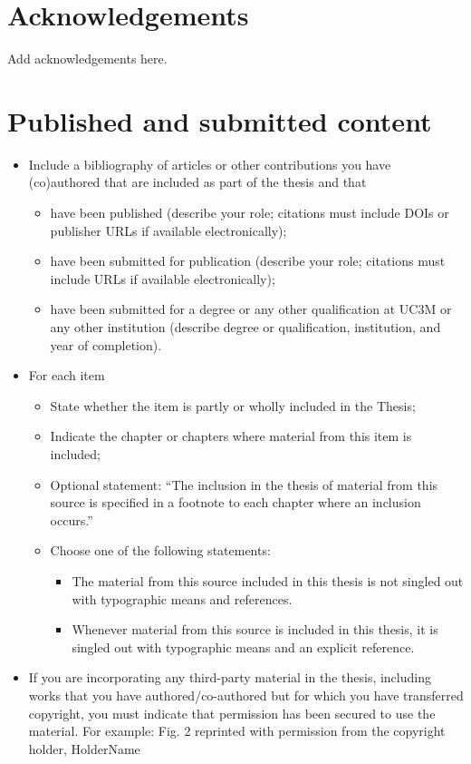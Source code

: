 \documentclass[12pt]{report} %
\begin{document}
\chapter*{Acknowledgements}
\thispagestyle{empty}
Add acknowledgements here. 

\chapter*{Published and submitted content}
\thispagestyle{empty}
\begin{itemize}
    \item Include a bibliography of articles or other contributions you have (co)authored that are included as part of the thesis and that
    \begin{itemize}
        \item have been published (describe your role; citations must include DOIs or publisher URLs if available electronically);  
        \item have been submitted for publication (describe your role; citations must include URLs if available electronically);
        \item have been submitted for a degree or any other qualification at UC3M or any other institution (describe degree or qualification, institution, and year of completion).
    \end{itemize}
    \item For each item 
    \begin{itemize}
        \item State whether the item is partly or wholly included in the Thesis;
        \item Indicate the chapter or chapters where material from this item is included;
        \item Optional statement: “The inclusion in the thesis of material from this source is specified in a footnote to each chapter where an inclusion occurs.”
        \item Choose one of the following statements:
        \begin{itemize}
            \item The material from this source included in this thesis is not singled out with typographic means and references.
            \item Whenever material from this source is included in this thesis, it is singled out with typographic means and an explicit reference.
        \end{itemize}
        \end{itemize}
    \item If you are incorporating any third-party material in the thesis, including works that you have authored/co-authored but for which you have transferred copyright, you must indicate that permission has been secured to use the material. For example: Fig.  2 reprinted with permission from the copyright holder, HolderName
\end{itemize}
\end{document}
